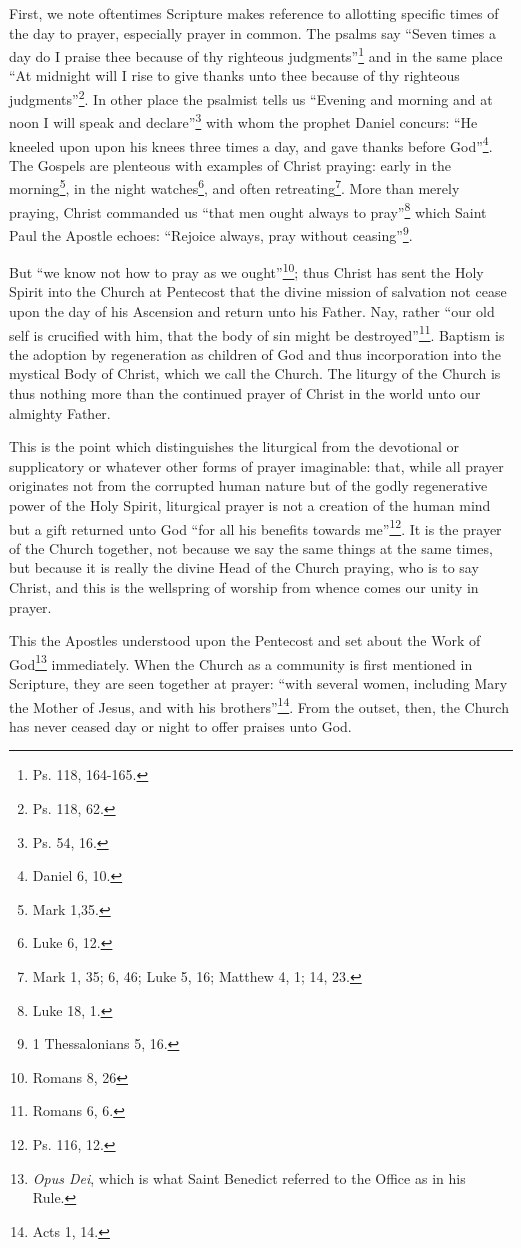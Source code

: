 		First, we note oftentimes Scripture makes reference to allotting specific times of the day to prayer, especially prayer in common. The psalms say \enquote{Seven times a day do I praise thee because of thy righteous judgments}\footnote{Ps. 118, 164-165.} and in the same place \enquote{At midnight will I rise to give thanks unto thee because of thy righteous judgments}\footnote{Ps. 118, 62.}. In other place the psalmist tells us \enquote{Evening and morning and at noon I will speak and declare}\footnote{Ps. 54, 16.} with whom the prophet Daniel concurs: \enquote{He kneeled upon upon his knees three times a day, and gave thanks before God}\footnote{Daniel 6, 10.}. The Gospels are plenteous with examples of Christ praying: early in the morning\footnote{Mark 1,35.}, in the night watches\footnote{Luke 6, 12.}, and often retreating\footnote{Mark 1, 35; 6, 46; Luke 5, 16; Matthew 4, 1; 14, 23.}. More than merely praying, Christ commanded us \enquote{that men ought always to pray}\footnote{Luke 18, 1.} which Saint Paul the Apostle echoes: \enquote{Rejoice always, pray without ceasing}\footnote{1 Thessalonians 5, 16.}.
		
		But \enquote{we know not how to pray as we ought}\footnote{Romans 8, 26}; thus Christ has sent the Holy Spirit into the Church at Pentecost that the divine mission of salvation not cease upon the day of his Ascension and return unto his Father. Nay, rather \enquote{our old self is crucified with him, that the body of sin might be destroyed}\footnote{Romans 6, 6.}. Baptism is the adoption by regeneration as children of God and thus incorporation into the mystical Body of Christ, which we call the Church. The liturgy of the Church is thus nothing more than the continued prayer of Christ in the world unto our almighty Father.
		
		This is the point which distinguishes the liturgical from the devotional or supplicatory or whatever other forms of prayer imaginable: that, while all prayer originates not from the corrupted human nature but of the godly regenerative power of the Holy Spirit, liturgical prayer is not a creation of the human mind but a gift returned unto God \enquote{for all his benefits towards me}\footnote{Ps. 116, 12.}. It is the prayer of the Church together, not because we say the same things at the same times, but because it is really the divine Head of the Church praying, who is to say Christ, and this is the wellspring of worship from whence comes our unity in prayer.
		
		This the Apostles understood upon the Pentecost and set about the Work of God\footnote{\textit{Opus Dei}, which is what Saint Benedict referred to the Office as in his Rule.} immediately. When the Church as a community is first mentioned in Scripture, they are seen together at prayer: \enquote{with several women, including Mary the Mother of Jesus, and with his brothers}\footnote{Acts 1, 14.}. From the outset, then, the Church has never ceased day or night to offer praises unto God.
		
